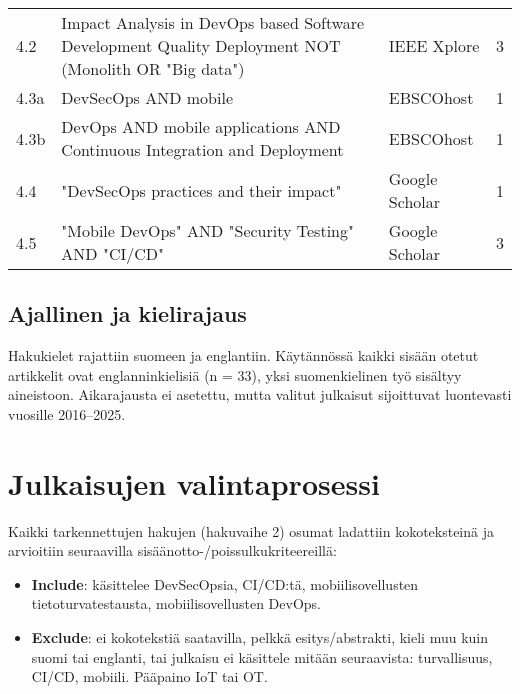 \documentclass[bscthesis,finnish,oneside,biblatex]{uefcsthesis}
\begin{document}
\begin{table}[htbp]
\begin{tabularx}{\textwidth}{l>{\ttfamily\small\raggedright\arraybackslash}X l r}
    4.2  & Impact Analysis in DevOps based Software Development Quality Deployment NOT (Monolith OR "Big data")                      & IEEE Xplore    & 3  \\
    4.3a & DevSecOps AND mobile                                                                                                      & EBSCOhost      & 1  \\
    4.3b & DevOps AND mobile applications AND Continuous Integration and Deployment                                                  & EBSCOhost      & 1  \\
    4.4  & "DevSecOps practices and their impact"                                                                                    & Google Scholar & 1  \\
    4.5  & "Mobile DevOps" AND "Security Testing" AND "CI/CD"                                                                        & Google Scholar & 3  \\
    \bottomrule
  \end{tabularx}
\end{table}

\subsection{Ajallinen ja kielirajaus}
\label{sec:search-limits}

Hakukielet rajattiin suomeen ja englantiin. Käytännössä kaikki sisään
otetut artikkelit ovat englanninkielisiä (n = 33), yksi suomenkielinen työ
sisältyy aineistoon. Aikarajausta ei asetettu, mutta
valitut julkaisut sijoittuvat luontevasti vuosille 2016–2025.

\section{Julkaisujen valintaprosessi}
\label{sec:selection}

Kaikki tarkennettujen hakujen (hakuvaihe 2) osumat ladattiin
kokoteksteinä ja arvioitiin seuraavilla sisäänotto-/poissulkukriteereillä:

\begin{itemize}
  \item \textbf{Include}: käsittelee DevSecOpsia, CI/CD:tä, mobiilisovellusten tietoturvatestausta, mobiilisovellusten DevOps.
  \item \textbf{Exclude}: ei kokotekstiä saatavilla, pelkkä esitys/abstrakti,
        kieli muu kuin suomi tai englanti, tai julkaisu ei käsittele mitään
        seuraavista: turvallisuus, CI/CD, mobiili. Pääpaino IoT tai OT.
\end{itemize}
\end{document}
